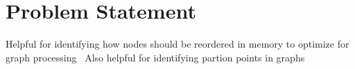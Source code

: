 \section{Problem Statement}
\label{section:41-CD-Problem-Statement}

Helpful for identifying how nodes should be reordered in memory to optimize for graph processing~\cite{Balaji2018}
Also helpful for identifying partion points in graphs